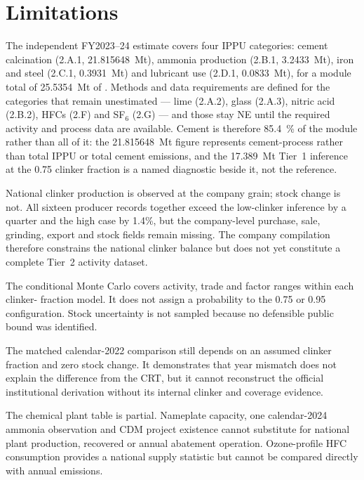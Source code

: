 \section{Limitations}
\label{sec:limitations}

The independent FY2023--24 estimate covers four IPPU categories: cement calcination
(2.A.1, \SI{21.815648}{\mega\tonne}), ammonia production (2.B.1, \SI{3.2433}{\mega\tonne}),
iron and steel (2.C.1, \SI{0.3931}{\mega\tonne}) and lubricant use (2.D.1,
\SI{0.0833}{\mega\tonne}), for a module total of \SI{25.5354}{\mega\tonne} of \COtwo{}.
Methods and data requirements are defined for the categories that remain unestimated --- lime
(2.A.2), glass (2.A.3), nitric acid (2.B.2), HFCs (2.F) and SF$_6$ (2.G) --- and those stay
NE until the required activity and process data are available. Cement is therefore
\SI{85.4}{\percent} of the module rather than all of it: the
\SI{21.815648}{\mega\tonne} figure represents cement-process \COtwo{} rather than total
IPPU or total cement emissions, and the \SI{17.389}{\mega\tonne} Tier~1 inference at the 0.75
clinker fraction is a named diagnostic beside it, not the reference.

National clinker production is observed at the company grain; stock change is not. All sixteen
producer records together exceed the low-clinker inference by a quarter and the high case by
1.4\%, but the company-level purchase, sale, grinding, export and stock fields remain
missing. The company compilation therefore constrains the national clinker balance but does
not yet constitute a complete Tier~2 activity dataset.

The conditional Monte Carlo covers activity, trade and factor ranges within each clinker-
fraction model. It does not assign a probability to the 0.75 or 0.95 configuration. Stock
uncertainty is not sampled because no defensible public bound was identified.

The matched calendar-2022 comparison still depends on an assumed clinker fraction and zero
stock change. It demonstrates that year mismatch does not explain the difference from the CRT,
but it cannot reconstruct the official institutional derivation without its internal clinker
and coverage evidence.

The chemical plant table is partial. Nameplate capacity, one calendar-2024 ammonia observation and CDM
project existence cannot substitute for national plant production, recovered \COtwo{} or
annual abatement operation. Ozone-profile HFC consumption provides a national supply statistic
but cannot be compared directly with annual emissions.

